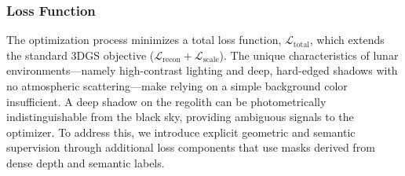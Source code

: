 \subsubsection{Loss Function}
The optimization process minimizes a total loss function, $\mathcal{L}_{\text{total}}$, which extends the standard 3DGS objective ($\mathcal{L}_{\text{recon}} + \mathcal{L}_{\text{scale}}$). The unique characteristics of lunar environments—namely high-contrast lighting and deep, hard-edged shadows with no atmospheric scattering—make relying on a simple background color insufficient. A deep shadow on the regolith can be photometrically indistinguishable from the black sky, providing ambiguous signals to the optimizer. To address this, we introduce explicit geometric and semantic supervision through additional loss components that use masks derived from dense depth and semantic labels.

